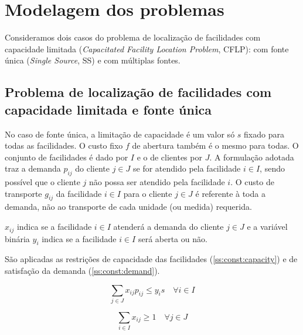 \documentclass[]{article}
\title{}
\begin{document}
\maketitle

\begin{abstract}

\end{abstract}

\section{Modelagem dos problemas}

	Consideramos dois casos do problema de localização de facilidades com capacidade limitada 
	(\textit{Capacitated Facility Location Problem}, CFLP):
	com fonte única (\textit{Single Source}, SS) 
	e com múltiplas fontes. 
	
	\subsection{Problema de localização de facilidades com capacidade limitada e fonte única}
	
	No caso de fonte única, a limitação de capacidade é um valor só $s$ fixado para todas as facilidades.
	O custo fixo $f$ de abertura também é o mesmo para todas.
	O conjunto de facilidades é dado por $I$ e o de clientes por $J$.
	A formulação adotada traz a demanda $p_{ij}$ do cliente $j \in J$ se for atendido pela facilidade $i \in I$, 
	sendo possível que o cliente $j$ não possa ser atendido pela facilidade $i$.
	O custo de transporte $g_{ij}$ da facilidade $i \in I$ para o cliente $j \in J$ é referente à toda a demanda, não ao transporte de cada unidade (ou medida) requerida.
	
	$x_{ij}$ indica se a facilidade $i \in I$ atenderá a demanda do cliente $j \in J$ 
	e a variável binária $y_i$ indica se a facilidade $i \in I$ será aberta ou não.
	
	São aplicadas as restrições de capacidade das facilidades (\ref{ss:const:capacity}) e de satisfação da demanda (\ref{ss:const:demand}).
	
	\begin{equation}
		\label{ss:const:capacity}		
		\sum_{j \in J} x_{ij} p_{ij} \le y_i s 
		\quad
		\forall i \in I
	\end{equation}	

	\begin{equation}
		\label{ss:const:demand}		
		\sum_{i \in I} x_{ij} \ge 1 
		\quad
		\forall j \in J
	\end{equation}
\end{document}
